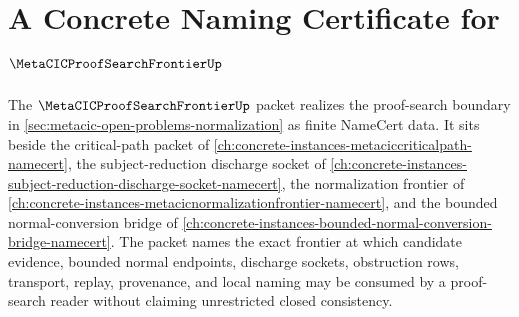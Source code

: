 \chapter{A Concrete Naming Certificate for $\MetaCICProofSearchFrontierUp$}
\label{ch:concrete-instances-metacic-proof-search-frontier-namecert}

The $\MetaCICProofSearchFrontierUp$ packet realizes the proof-search boundary in \autoref{sec:metacic-open-problems-normalization} as finite NameCert data. It sits beside the critical-path packet of \autoref{ch:concrete-instances-metaciccriticalpath-namecert}, the subject-reduction discharge socket of \autoref{ch:concrete-instances-subject-reduction-discharge-socket-namecert}, the normalization frontier of \autoref{ch:concrete-instances-metacicnormalizationfrontier-namecert}, and the bounded normal-conversion bridge of \autoref{ch:concrete-instances-bounded-normal-conversion-bridge-namecert}. The packet names the exact frontier at which candidate evidence, bounded normal endpoints, discharge sockets, obstruction rows, transport, replay, provenance, and local naming may be consumed by a proof-search reader without claiming unrestricted closed consistency.



